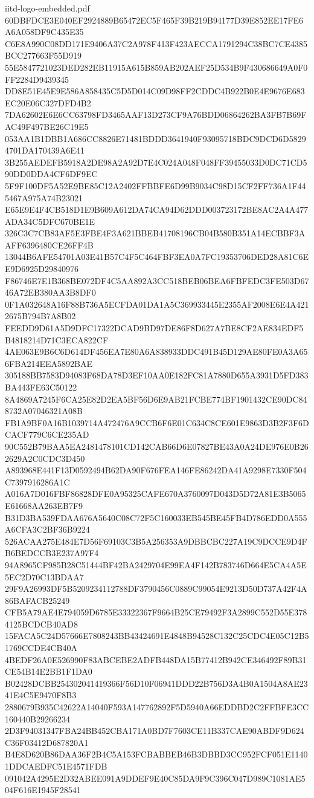 \begin{filecontents*}[overwrite]{iitd-logo-embedded.pdf}
60DBFDCE3E040EF2924889B65472EC5F465F39B219B94177D39E852EE17FE6A6A058DF9C435E35
C6E8A990C08DD171E9406A37C2A978F413F423AECCA1791294C38BC7CE4385BCC277663F55D919
55E5847721023DED282EB11915A615B859AB202AEF25D534B9F430686649A0F0FF2284D9439345
DD8E51E45E9E586A858435C5D5D014C09D98FF2CDDC4B922B0E4E9676E683EC20E06C327DFD4B2
7DA62602E6E6CC63798FD3465AAF13D273CF9A76BDD06864262BA3FB7B69FAC49F497BE26C19E5
053AA1B1DBB1A686CC8826E71481BDDD3641940F93095718BDC9DCD6D58294701DA170439A6E41
3B255AEDEFB5918A2DE98A2A92D7E4C024A048F048FF39455033D0DC71CD590DD0DDA4CF6DF9EC
5F9F100DF5A52E9BE85C12A2402FFBBFE6D99B9034C98D15CF2FF736A1F445467A975A74B23021
E65E9E4F4CB518D1E9B609A612DA74CA94D62DDD003723172BE8AC2A4A477ADA34C5DFC670BE1E
326C3C7CB83AF5E3FBE4F3A621BBEB41708196CB04B580B351A14ECBBF3AAFF6396480CE26FF4B
13044B6AFE54701A03E41B57C4F5C464FBF3EA0A7FC19353706DED28A81C6EE9D6925D29840976
F86746E7E1B368BE072DF4C5AA892A3CC518BEB06BEA6FBFEDC3FE503D6746A72EB380AA3B8DF0
0F1A032648A16F88B736A5ECFDA01DA1A5C369933445E2355AF2008E6E4A4212675B794B7A8B02
FEEDD9D61A5D9DFC17322DCAD9BD97DE86F8D627A7BE8CF2AE834EDF5B4818214D71C3ECA822CF
4AE063E9B6C6D614DF456EA7E80A6A838933DDC491B45D129AE80FE0A3A656FBA214EEA5892BAE
305188BB7583D94083F68DA78D3EF10AA0E182FC81A7880D655A3931D5FD383BA443FE63C50122
8A4869A7245F6CA25E82D2EA5BF56D6E9AB21FCBE774BF1901432CE90DC848732A07046321A08B
FB1A9BF0A16B1039714A472476A9CCB6F6E01C634C8CE601E9863D3B2F3F6DCACF779C6CE235AD
90C552B79BAA5EA2481478101CD142CAB66D6E07827BE43A0A24DE976E0B262629A2C0CDC3D450
A893968E441F13D0592494B62DA90F676FEA146FE86242DA41A9298E7330F504C7397916286A1C
A016A7D016FBF86828DFE0A95325CAFE670A3760097D043D5D72A81E3B5065E61668AA263EB7F9
B31D3BA539FDAA676A5640C08C72F5C160033EB545BE45FB4D786EDD0A555A6CFA3C2BF36B9224
526ACAA275E484E7D56F69103C3B5A256353A9DBBCBC227A19C9DCCE9D4FB6BEDCCB3E237A97F4
94A8965CF985B28C51444BF42BA2429704E99EA4F142B783746D664E5CA4A5E5EC2D70C13BDAA7
29F9A26993DF5B5209234112788DF3790456C0889C99054E9213D50D737A42F4A86BAFACB25249
CFB5A79AE4E794059D6785E33322367F9664B25CE79492F3A2899C552D55E3784125BCDCB40AD8
15FACA5C24D57666E7808243BB43424691E4848B94528C132C25CDC4E05C12B51769CCDE4CB40A
4BEDF26A0E526990F83ABCEBE2ADFB448DA15B77412B942CE346492F89B31CE54B14E2BB1F1DA0
B02428DCBB254302041419366F56D10F06941DDD22B756D3A4B0A1504A8AE2341E4C5E9470F8B3
2880679B935C42622A14040F593A147762892F5D5940A66EDDBD2C2FFBFE3CC160440B29266234
2D3F94031347FBA24BB452CBA171A0BD7F7603CE11B337CAE90ABDF9D624C36F03412D687820A1
B4E8D620B86DAA36F2B4C5A153FCBABBEB46B3DBBD3CC952FCF051E11401DDCAEDFC51E4571FDB
091042A4295E2D32ABEE091A9DDEF9E40C85DA9F9C396C047D989C1081AE504F616E1945F28541

\end{filecontents*}

